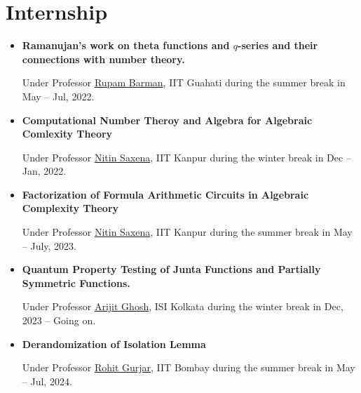 \documentclass[10pt,a4paper,sans,colorlinks]{moderncv}        %
\begin{document}
\section{Internship}
\begin{itemize}
	\item \textbf{Ramanujan's work on theta functions and $q$-series and their connections with number theory.}

	      \hfill Under Professor \href{https://www.iitg.ac.in/rupam/}{Rupam Barman}, IIT Guahati during the summer break in May -- Jul, 2022.

	\item \textbf{Computational Number Theroy and Algebra for Algebraic Comlexity Theory }

	      \hfill Under Professor \href{https://www.cse.iitk.ac.in/users/nitin/}{Nitin Saxena}, IIT Kanpur during the winter break in Dec -- Jan, 2022.
	      
	\item \textbf{Factorization of Formula Arithmetic Circuits in Algebraic Complexity Theory }
	
	\hfill Under Professor \href{https://www.cse.iitk.ac.in/users/nitin/}{Nitin Saxena}, IIT Kanpur during the summer break in May -- July, 2023.
	\item \textbf{Quantum Property Testing of Junta Functions and Partially Symmetric Functions.}
	
	\hfill Under Professor \href{https://sites.google.com/site/homepagearijitghosh/}{Arijit Ghosh}, ISI Kolkata during the winter break in Dec, 2023 -- Going on.
	
		\item \textbf{Derandomization of Isolation Lemma}
	
	\hfill Under Professor \href{https://www.cse.iitb.ac.in/~rgurjar/}{Rohit Gurjar}, IIT Bombay during the summer break in May -- Jul, 2024.
\end{itemize}

\end{document}

